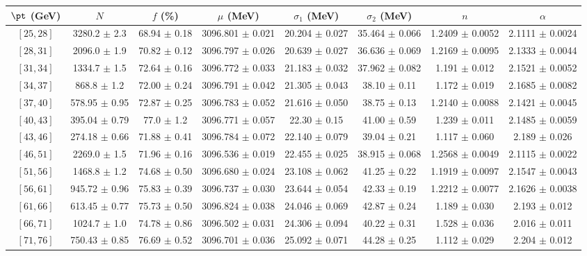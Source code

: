 \begin{tabular}{c||c|c|c|c|c|c|c}
$\pt$ (GeV) & $N$ & $f$ (\%) & $\mu$ (MeV) & $\sigma_1$ (MeV) & $\sigma_2$ (MeV) & $n$ & $\alpha$ \\
\hline
$[25, 28]$ & 3280.2 $\pm$ 2.3 & 68.94 $\pm$ 0.18 & 3096.801 $\pm$ 0.021 & 20.204 $\pm$ 0.027 & 35.464 $\pm$ 0.066 & 1.2409 $\pm$ 0.0052 & 2.1111 $\pm$ 0.0024\\
$[28, 31]$ & 2096.0 $\pm$ 1.9 & 70.82 $\pm$ 0.12 & 3096.797 $\pm$ 0.026 & 20.639 $\pm$ 0.027 & 36.636 $\pm$ 0.069 & 1.2169 $\pm$ 0.0095 & 2.1333 $\pm$ 0.0044\\
$[31, 34]$ & 1334.7 $\pm$ 1.5 & 72.64 $\pm$ 0.16 & 3096.772 $\pm$ 0.033 & 21.183 $\pm$ 0.032 & 37.962 $\pm$ 0.082 & 1.191 $\pm$ 0.012 & 2.1521 $\pm$ 0.0052\\
$[34, 37]$ & 868.8 $\pm$ 1.2 & 72.00 $\pm$ 0.24 & 3096.791 $\pm$ 0.042 & 21.305 $\pm$ 0.043 & 38.10 $\pm$ 0.11 & 1.172 $\pm$ 0.019 & 2.1685 $\pm$ 0.0082\\
$[37, 40]$ & 578.95 $\pm$ 0.95 & 72.87 $\pm$ 0.25 & 3096.783 $\pm$ 0.052 & 21.616 $\pm$ 0.050 & 38.75 $\pm$ 0.13 & 1.2140 $\pm$ 0.0088 & 2.1421 $\pm$ 0.0045\\
$[40, 43]$ & 395.04 $\pm$ 0.79 & 77.0 $\pm$ 1.2 & 3096.771 $\pm$ 0.057 & 22.30 $\pm$ 0.15 & 41.00 $\pm$ 0.59 & 1.239 $\pm$ 0.011 & 2.1485 $\pm$ 0.0059\\
$[43, 46]$ & 274.18 $\pm$ 0.66 & 71.88 $\pm$ 0.41 & 3096.784 $\pm$ 0.072 & 22.140 $\pm$ 0.079 & 39.04 $\pm$ 0.21 & 1.117 $\pm$ 0.060 & 2.189 $\pm$ 0.026\\
$[46, 51]$ & 2269.0 $\pm$ 1.5 & 71.96 $\pm$ 0.16 & 3096.536 $\pm$ 0.019 & 22.455 $\pm$ 0.025 & 38.915 $\pm$ 0.068 & 1.2568 $\pm$ 0.0049 & 2.1115 $\pm$ 0.0022\\
$[51, 56]$ & 1468.8 $\pm$ 1.2 & 74.68 $\pm$ 0.50 & 3096.680 $\pm$ 0.024 & 23.108 $\pm$ 0.062 & 41.25 $\pm$ 0.22 & 1.1919 $\pm$ 0.0097 & 2.1547 $\pm$ 0.0043\\
$[56, 61]$ & 945.72 $\pm$ 0.96 & 75.83 $\pm$ 0.39 & 3096.737 $\pm$ 0.030 & 23.644 $\pm$ 0.054 & 42.33 $\pm$ 0.19 & 1.2212 $\pm$ 0.0077 & 2.1626 $\pm$ 0.0038\\
$[61, 66]$ & 613.45 $\pm$ 0.77 & 75.73 $\pm$ 0.50 & 3096.824 $\pm$ 0.038 & 24.046 $\pm$ 0.069 & 42.87 $\pm$ 0.24 & 1.189 $\pm$ 0.030 & 2.193 $\pm$ 0.012\\
$[66, 71]$ & 1024.7 $\pm$ 1.0 & 74.78 $\pm$ 0.86 & 3096.502 $\pm$ 0.031 & 24.306 $\pm$ 0.094 & 40.22 $\pm$ 0.31 & 1.528 $\pm$ 0.036 & 2.016 $\pm$ 0.011\\
$[71, 76]$ & 750.43 $\pm$ 0.85 & 76.69 $\pm$ 0.52 & 3096.701 $\pm$ 0.036 & 25.092 $\pm$ 0.071 & 44.28 $\pm$ 0.25 & 1.112 $\pm$ 0.029 & 2.204 $\pm$ 0.012\\

\end{tabular}
